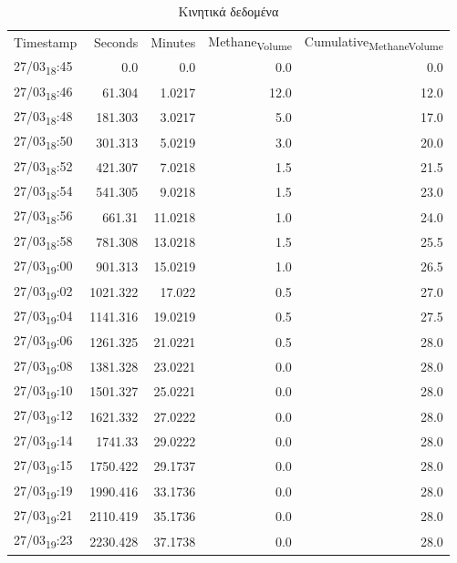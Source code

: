 \documentclass[11pt]{article}
\begin{document}
\begin{table}[htbp]
\caption{Κινητικά δεδομένα}
\centering
\begin{tabular}{lrrrr}
Timestamp & Seconds & Minutes & Methane\textsubscript{Volume} & Cumulative\textsubscript{Methane}\textsubscript{Volume}\\[0pt]
27/03\textsubscript{18}:45 & 0.0 & 0.0 & 0.0 & 0.0\\[0pt]
27/03\textsubscript{18}:46 & 61.304 & 1.0217 & 12.0 & 12.0\\[0pt]
27/03\textsubscript{18}:48 & 181.303 & 3.0217 & 5.0 & 17.0\\[0pt]
27/03\textsubscript{18}:50 & 301.313 & 5.0219 & 3.0 & 20.0\\[0pt]
27/03\textsubscript{18}:52 & 421.307 & 7.0218 & 1.5 & 21.5\\[0pt]
27/03\textsubscript{18}:54 & 541.305 & 9.0218 & 1.5 & 23.0\\[0pt]
27/03\textsubscript{18}:56 & 661.31 & 11.0218 & 1.0 & 24.0\\[0pt]
27/03\textsubscript{18}:58 & 781.308 & 13.0218 & 1.5 & 25.5\\[0pt]
27/03\textsubscript{19}:00 & 901.313 & 15.0219 & 1.0 & 26.5\\[0pt]
27/03\textsubscript{19}:02 & 1021.322 & 17.022 & 0.5 & 27.0\\[0pt]
27/03\textsubscript{19}:04 & 1141.316 & 19.0219 & 0.5 & 27.5\\[0pt]
27/03\textsubscript{19}:06 & 1261.325 & 21.0221 & 0.5 & 28.0\\[0pt]
27/03\textsubscript{19}:08 & 1381.328 & 23.0221 & 0.0 & 28.0\\[0pt]
27/03\textsubscript{19}:10 & 1501.327 & 25.0221 & 0.0 & 28.0\\[0pt]
27/03\textsubscript{19}:12 & 1621.332 & 27.0222 & 0.0 & 28.0\\[0pt]
27/03\textsubscript{19}:14 & 1741.33 & 29.0222 & 0.0 & 28.0\\[0pt]
27/03\textsubscript{19}:15 & 1750.422 & 29.1737 & 0.0 & 28.0\\[0pt]
27/03\textsubscript{19}:19 & 1990.416 & 33.1736 & 0.0 & 28.0\\[0pt]
27/03\textsubscript{19}:21 & 2110.419 & 35.1736 & 0.0 & 28.0\\[0pt]
27/03\textsubscript{19}:23 & 2230.428 & 37.1738 & 0.0 & 28.0\\[0pt]
\end{tabular}
\end{table}
\end{document}
